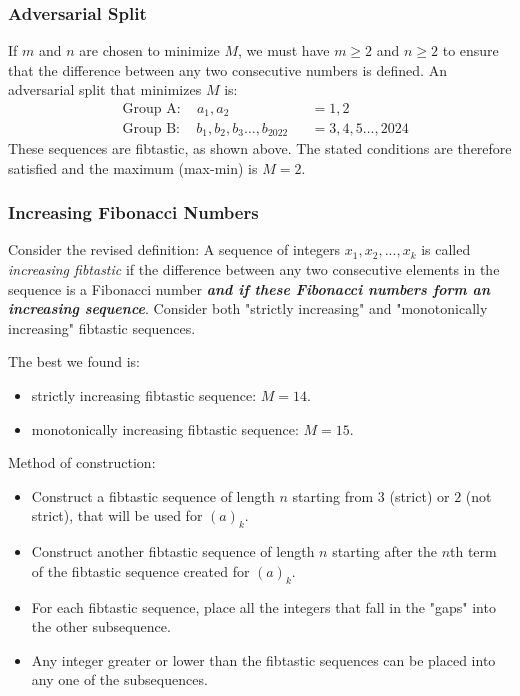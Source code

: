 \subsubsection*{Adversarial Split}
If $m$ and $n$ are chosen to minimize $M$, we must have $m\ge2$ and $n\ge2$ to ensure that the difference between any two consecutive numbers is defined. An adversarial split that minimizes $M$ is:
\begin{align*}
& \text{Group A}: 
\quad
a_{1}, a_{2}
&& = 1, 2
\\
& \text{Group B}: 
\quad
b_{1},b_{2},b_{3}\ldots,b_{2022}
&& = 3,4,5\ldots,2024
\end{align*}
These sequences are fibtastic, as shown above. The stated conditions are therefore satisfied and the maximum (max-min) is $M=2$. 

\subsubsection*{Increasing Fibonacci Numbers}
Consider the revised definition:
A sequence of integers $x_{1},x_{2},...,x_{k}$ is called \textit{increasing fibtastic} if the difference between any two consecutive elements in the sequence is a Fibonacci number \textbf{\textit{and if these Fibonacci numbers form an increasing sequence}}. Consider both "strictly increasing" and "monotonically increasing" fibtastic sequences. 

The best we found is:
\begin{itemize}[label=-]
\item strictly increasing fibtastic sequence: $M=14$.
\item monotonically increasing fibtastic sequence: $M=15$.
\end{itemize}

Method of construction:
\begin{itemize}
\item Construct a fibtastic sequence of length $n$ starting from $3$ (strict) or $2$ (not strict), that will be used for $(a)_{k}$.
\item Construct another fibtastic sequence of length $n$ starting after the $n$th term of the fibtastic sequence created for $(a)_{k}$.
\item For each fibtastic sequence, place all the integers that fall in the "gaps" into the other subsequence. 
\item Any integer greater or lower than the fibtastic sequences can be placed into any one of the subsequences.
\end{itemize}

